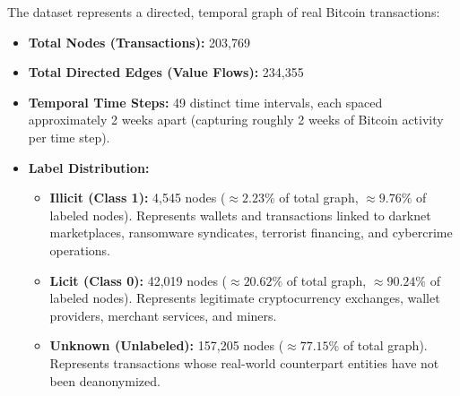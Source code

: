 \documentclass[11pt,a4paper]{report}
\begin{document}
The dataset represents a directed, temporal graph of real Bitcoin transactions:
\begin{itemize}[leftmargin=1.5em]
  \item \textbf{Total Nodes (Transactions):} 203,769
  \item \textbf{Total Directed Edges (Value Flows):} 234,355
  \item \textbf{Temporal Time Steps:} 49 distinct time intervals, each spaced approximately 2 weeks apart (capturing roughly 2 weeks of Bitcoin activity per time step).
  \item \textbf{Label Distribution:}
  \begin{itemize}
    \item \textbf{Illicit (Class 1):} 4,545 nodes ($\approx 2.23\%$ of total graph, $\approx 9.76\%$ of labeled nodes). Represents wallets and transactions linked to darknet marketplaces, ransomware syndicates, terrorist financing, and cybercrime operations.
    \item \textbf{Licit (Class 0):} 42,019 nodes ($\approx 20.62\%$ of total graph, $\approx 90.24\%$ of labeled nodes). Represents legitimate cryptocurrency exchanges, wallet providers, merchant services, and miners.
    \item \textbf{Unknown (Unlabeled):} 157,205 nodes ($\approx 77.15\%$ of total graph). Represents transactions whose real-world counterpart entities have not been deanonymized.
  \end{itemize}
\end{itemize}
\end{document}
